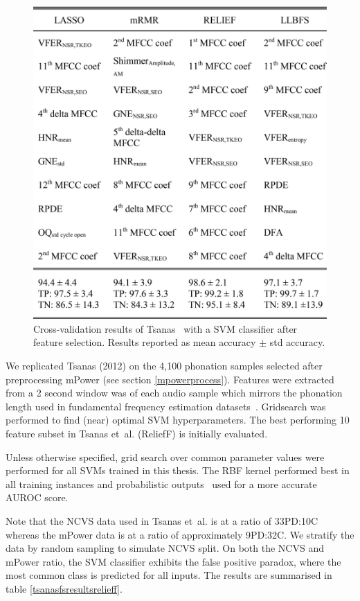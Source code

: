 \documentclass[12pt, twoside]{book}
\begin{document}
\begin{figure}[h]
\caption{Cross-validation results of Tsanas~\cite{tsanas2012novel} with a SVM classifier after feature selection. Results reported as mean accuracy $\pm$ std accuracy.}
\label{tsanasresults}
\centering\includegraphics[width=0.75\linewidth]{tsanas.png}
\end{figure}
 
We replicated Tsanas (2012) on the 4,100 phonation samples selected after preprocessing mPower (see section \ref{mpowerprocess}). Features were extracted from a 2 second window was of each audio sample which mirrors the phonation length used in fundamental frequency estimation datasets~\cite{f0estimation}. Gridsearch was performed to find (near) optimal SVM hyperparameters. The best performing 10 feature subset in Tsanas et~al. (ReliefF) is initially evaluated.

\begin{highlight}
	Unless otherwise specified, grid search over common parameter values were performed for all SVMs trained in this thesis. The RBF kernel performed best in all training instances and probabilistic outputs~\cite{svmprobabilistic} used for a more accurate AUROC score.
\end{highlight}

Note that the NCVS data used in Tsanas et~al. is at a ratio of 33PD:10C whereas the mPower data is at a ratio of approximately 9PD:32C. We stratify the data by random sampling to simulate NCVS split. On both the NCVS and mPower ratio, the SVM classifier exhibits the false positive paradox, where the most common class is predicted for all inputs. The results are summarised in table \ref{tsanasfsresultsrelieff}. 
\end{document}
